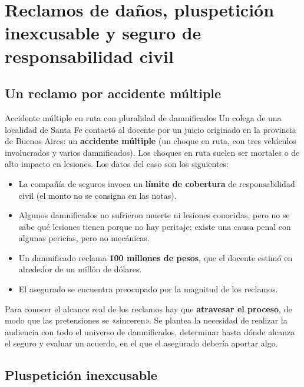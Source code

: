 \documentclass[12pt,oneside]{book}
\begin{document}
\chapter[Reclamos de daños y seguro]{Reclamos de daños, pluspetición inexcusable y seguro de responsabilidad civil}

\section{Un reclamo por accidente múltiple}

\begin{example}{Accidente múltiple en ruta con pluralidad de damnificados}
Un colega de una localidad de Santa Fe contactó al docente por un juicio originado en la provincia de Buenos Aires: un \textbf{accidente múltiple} (un choque en ruta, con tres vehículos involucrados y varios damnificados). Los choques en ruta suelen ser mortales o de alto impacto en lesiones. Los datos del caso son los siguientes:
\begin{itemize}
    \item La compañía de seguros invoca un \textbf{límite de cobertura} de responsabilidad civil (el monto no se consigna en las notas).
    \item Algunos damnificados no sufrieron muerte ni lesiones conocidas, pero no se sabe qué lesiones tienen porque no hay peritaje; existe una causa penal con algunas pericias, pero no mecánicas.
    \item Un damnificado reclama \textbf{100 millones de pesos}, que el docente estimó en alrededor de un millón de dólares.
    \item El asegurado se encuentra preocupado por la magnitud de los reclamos.
\end{itemize}
\end{example}

Para conocer el alcance real de los reclamos hay que \textbf{atravesar el proceso}, de modo que las pretensiones se «sinceren». Se plantea la necesidad de realizar la audiencia con todo el universo de damnificados, determinar hasta dónde alcanza el seguro y evaluar un acuerdo, en el que el asegurado debería aportar algo.

\section{Pluspetición inexcusable}
\end{document}
